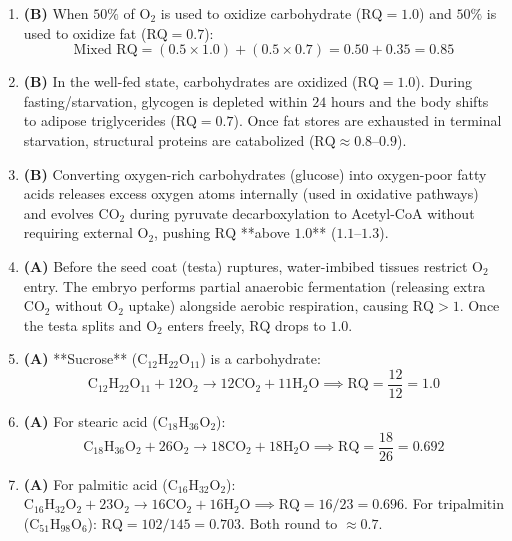 \documentclass[11pt, a4paper]{article}
\begin{document}
\begin{enumerate}[label=\textbf{\arabic*.}]
\item \textbf{(B)} When $50\%$ of $\text{O}_2$ is used to oxidize carbohydrate ($\text{RQ} = 1.0$) and $50\%$ is used to oxidize fat ($\text{RQ} = 0.7$):
$$\text{Mixed RQ} = (0.5 \times 1.0) + (0.5 \times 0.7) = 0.50 + 0.35 = \mathbf{0.85}$$

\item \textbf{(B)} In the well-fed state, carbohydrates are oxidized ($\text{RQ} = 1.0$). During fasting/starvation, glycogen is depleted within $24\text{ hours}$ and the body shifts to adipose triglycerides ($\text{RQ} = 0.7$). Once fat stores are exhausted in terminal starvation, structural proteins are catabolized ($\text{RQ} \approx 0.8\text{--}0.9$).

\item \textbf{(B)} Converting oxygen-rich carbohydrates (glucose) into oxygen-poor fatty acids releases excess oxygen atoms internally (used in oxidative pathways) and evolves $\text{CO}_2$ during pyruvate decarboxylation to Acetyl-CoA without requiring external $\text{O}_2$, pushing $\text{RQ}$ **above $1.0$** ($1.1\text{--}1.3$).

\item \textbf{(A)} Before the seed coat (testa) ruptures, water-imbibed tissues restrict $\text{O}_2$ entry. The embryo performs partial anaerobic fermentation (releasing extra $\text{CO}_2$ without $\text{O}_2$ uptake) alongside aerobic respiration, causing $\text{RQ} > 1$. Once the testa splits and $\text{O}_2$ enters freely, $\text{RQ}$ drops to $1.0$.

\item \textbf{(A)} **Sucrose** ($\text{C}_{12}\text{H}_{22}\text{O}_{11}$) is a carbohydrate:
$$\text{C}_{12}\text{H}_{22}\text{O}_{11} + 12\text{O}_2 \longrightarrow 12\text{CO}_2 + 11\text{H}_2\text{O} \implies \text{RQ} = \frac{12}{12} = \mathbf{1.0}$$

\item \textbf{(A)} For stearic acid ($\text{C}_{18}\text{H}_{36}\text{O}_2$):
$$\text{C}_{18}\text{H}_{36}\text{O}_2 + 26\text{O}_2 \longrightarrow 18\text{CO}_2 + 18\text{H}_2\text{O} \implies \text{RQ} = \frac{18}{26} = \mathbf{0.692}$$

\item \textbf{(A)} For palmitic acid ($\text{C}_{16}\text{H}_{32}\text{O}_2$): $\text{C}_{16}\text{H}_{32}\text{O}_2 + 23\text{O}_2 \rightarrow 16\text{CO}_2 + 16\text{H}_2\text{O} \implies \text{RQ} = 16/23 = \mathbf{0.696}$. For tripalmitin ($\text{C}_{51}\text{H}_{98}\text{O}_6$): $\text{RQ} = 102/145 = \mathbf{0.703}$. Both round to $\approx 0.7$.


\end{enumerate}
\end{document}
